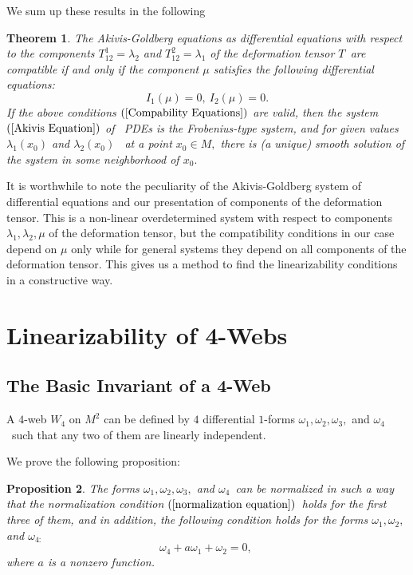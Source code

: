 \documentclass{article}
\newtheorem{theorem}{Theorem}
\newtheorem{proposition}[theorem]{Proposition}
\begin{document}
We sum up these results in the following

\begin{theorem}
The Akivis-Goldberg equations as differential equations with respect to the
components $T_{12}^{1}=\lambda _{2}$ and $T_{12}^{2}=\lambda _{1}$ of the
deformation tensor $T$\ are compatible if and only if the component $\mu $
satisfies the following differential equations:
\begin{equation*}
I_{1}\left( \mu \right) =0,\ I_{2}\left( \mu \right) =0.
\end{equation*}%
If the above conditions $(\ref{Compability Equations})$ are valid, then the
system $(\ref{Akivis Equation})$ of \ PDEs is the Frobenius-type system, and
for given values $\lambda _{1}\left( x_{0}\right) $ and $\lambda _{2}\left(
x_{0}\right) $ \ at a point $x_{0}\in M,$ there is (a unique) smooth
solution of the system in some neighborhood of $x_{0}.$
\end{theorem}

It is worthwhile to note the peculiarity of the Akivis-Goldberg system of
differential equations and our presentation of components of the deformation
tensor. This is a non-linear overdetermined system with respect to
components $\lambda _{1},\lambda _{2},\mu $ of the deformation tensor, but
the compatibility conditions in our case depend on $\mu $ only while for
general systems they depend on all components of the deformation tensor.
This gives us a method to find the linearizability conditions in a
constructive way.

\section{Linearizability of 4-Webs}

\subsection{The Basic Invariant of a 4-Web}

A $4$-web $W_{4}$ on $M^{2}$ can be defined by $4$ differential \thinspace $%
1 $-forms $\omega _{1},\omega _{2},\omega _{3},$ and $\omega _{4}$\ such
that any two of them are linearly independent.

We prove the following proposition:

\begin{proposition}
\bigskip The forms $\omega _{1},\omega _{2},\omega _{3},$ and $\omega _{4}$\
can be normalized in such a way that the normalization condition $(\ref%
{normalization equation})$\ holds for the first three of them, and in
addition, the following condition holds for the forms $\omega _{1},\omega
_{2},$ and $\omega _{4:}$\qquad \qquad
\begin{equation}
\omega _{4}+a\omega _{1}+\omega _{2}=0,\   \label{4web normalization}
\end{equation}%
where $a$ is a nonzero function.
\end{proposition}
\end{document}
